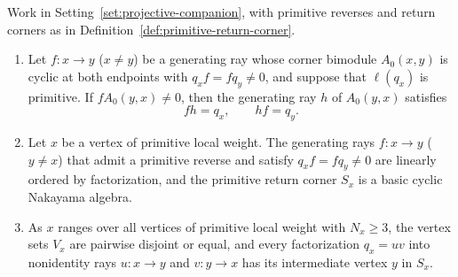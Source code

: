 \begin{lemma}
\label{lem:primitive-cyclic-corners}
Work in Setting~\ref{set:projective-companion}, with primitive reverses and return corners as in Definition~\ref{def:primitive-return-corner}.
\begin{enumerate}[label={\upshape(\arabic*)}]
\item Let $f\colon x\to y$ ($x\ne y$) be a generating ray whose corner bimodule $A_0(x,y)$ is cyclic at both endpoints with $q_xf=fq_y\ne0$, and suppose that $\ell(q_x)$ is primitive. If $fA_0(y,x)\ne0$, then the generating ray $h$ of $A_0(y,x)$ satisfies
\[
  fh=q_x,\qquad hf=q_y.
\]
\item Let $x$ be a vertex of primitive local weight. The generating rays $f\colon x\to y$ ($y\ne x$) that admit a primitive reverse and satisfy $q_xf=fq_y\ne0$ are linearly ordered by factorization, and the primitive return corner $S_x$ is a basic cyclic Nakayama algebra.
\item As $x$ ranges over all vertices of primitive local weight with $N_x\geq3$, the vertex sets $V_x$ are pairwise disjoint or equal, and every factorization $q_x=uv$ into nonidentity rays $u\colon x\to y$ and $v\colon y\to x$ has its intermediate vertex $y$ in $S_x$.
\end{enumerate}
\end{lemma}
